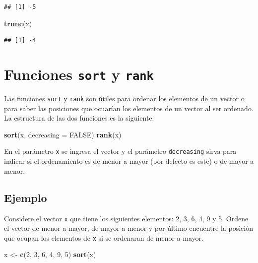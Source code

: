 \documentclass[10pt,]{krantz}
\makeatletter
\newenvironment{Shaded}{\begin{snugshade}}{\end{snugshade}}
\newcommand{\KeywordTok}[1]{\textcolor[rgb]{0.13,0.29,0.53}{\textbf{#1}}}
\newcommand{\DataTypeTok}[1]{\textcolor[rgb]{0.13,0.29,0.53}{#1}}
\newcommand{\DecValTok}[1]{\textcolor[rgb]{0.00,0.00,0.81}{#1}}
\newcommand{\StringTok}[1]{\textcolor[rgb]{0.31,0.60,0.02}{#1}}
\newcommand{\OtherTok}[1]{\textcolor[rgb]{0.56,0.35,0.01}{#1}}
\newcommand{\NormalTok}[1]{#1}
\newenvironment{kframe}{%
\medskip{}
\setlength{\fboxsep}{.8em}
 \def\at@end@of@kframe{}%
 \ifinner\ifhmode%
  \def\at@end@of@kframe{\end{minipage}}%
  \begin{minipage}{\columnwidth}%
 \fi\fi%
 \def\FrameCommand##1{\hskip\@totalleftmargin \hskip-\fboxsep
 \colorbox{shadecolor}{##1}\hskip-\fboxsep
     \hskip-\linewidth \hskip-\@totalleftmargin \hskip\columnwidth}%
 \MakeFramed {\advance\hsize-\width
   \@totalleftmargin\z@ \linewidth\hsize
   \@setminipage}}%
 {\par\unskip\endMakeFramed%
 \at@end@of@kframe}
\renewenvironment{Shaded}{\begin{kframe}}{\end{kframe}}
\makeatother
\begin{document}
\begin{verbatim}
## [1] -5
\end{verbatim}

\begin{Shaded}
\begin{Highlighting}[]
\KeywordTok{trunc}\NormalTok{(x)}
\end{Highlighting}
\end{Shaded}

\begin{verbatim}
## [1] -4
\end{verbatim}

\section{\texorpdfstring{Funciones \texttt{sort} y \texttt{rank}
  
}{Funciones sort y rank    }}\label{funciones-sort-y-rank}

Las funciones \texttt{sort} y \texttt{rank} son útiles para ordenar los
elementos de un vector o para saber las posiciones que ocuarían los
elementos de un vector al ser ordenado. La estructura de las dos
funciones es la siguiente.

\begin{Shaded}
\begin{Highlighting}[]
\KeywordTok{sort}\NormalTok{(x, }\DataTypeTok{decreasing =} \OtherTok{FALSE}\NormalTok{)}
\KeywordTok{rank}\NormalTok{(x)}
\end{Highlighting}
\end{Shaded}

En el parámetro \texttt{x} se ingresa el vector y el parámetro
\texttt{decreasing} sirva para indicar si el ordenamiento es de menor a
mayor (por defecto es este) o de mayor a menor.

\subsection*{Ejemplo}\label{ejemplo-14}


Considere el vector \texttt{x} que tiene los siguientes elementos: 2, 3,
6, 4, 9 y 5. Ordene el vector de menor a mayor, de mayor a menor y por
último encuentre la posición que ocupan los elementos de \texttt{x} si
se ordenaran de menor a mayor.

\begin{Shaded}
\begin{Highlighting}[]
\NormalTok{x <-}\StringTok{ }\KeywordTok{c}\NormalTok{(}\DecValTok{2}\NormalTok{, }\DecValTok{3}\NormalTok{, }\DecValTok{6}\NormalTok{, }\DecValTok{4}\NormalTok{, }\DecValTok{9}\NormalTok{, }\DecValTok{5}\NormalTok{)}
\KeywordTok{sort}\NormalTok{(x)}
\end{Highlighting}
\end{Shaded}
\end{document}

